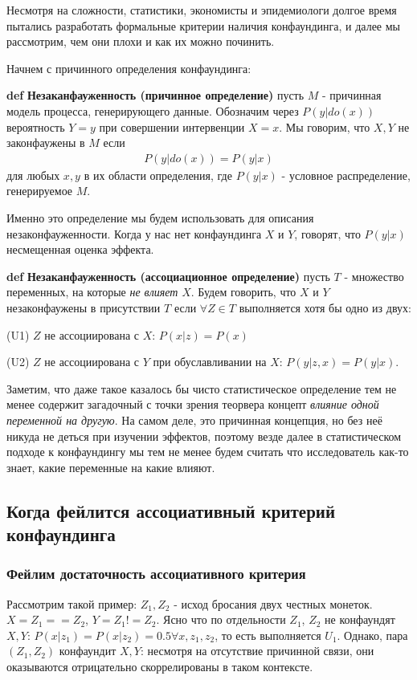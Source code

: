 \documentclass[fleqn]{article}
\def\define#1{\textbf{def} \textbf{#1}}
\numberwithin{equation}{section}
\numberwithin{theorem}{section}
\numberwithin{figure}{section}
\numberwithin{lemma}{section}
\numberwithin{corollary}{section}
\begin{document}
Несмотря на сложности, статистики, экономисты и эпидемиологи долгое время пытались разработать формальные критерии наличия конфаундинга, и далее мы рассмотрим, чем они плохи и как их можно починить.

Начнем с причинного определения конфаундинга:

\define{Незаканфауженность (причинное определение)} пусть $M$ - причинная модель процесса, генерирующего данные. Обозначим через $P(y|do(x))$ вероятность $Y = y$ при совершении интервенции $X=x$. Мы говорим, что $X, Y$  не законфаужены в $M$ если 
\begin{align}
	P(y|do(x)) = P(y|x)
\end{align}
для любых $x,y$ в их области определения, где $P(y|x)$ - условное распределение, генерируемое $M$.

Именно это определение мы будем использовать для описания незаконфауженности. Когда у нас нет конфаундинга $X$ и $Y$, говорят, что $P(y|x)$ несмещенная оценка эффекта.

\define{Незаканфауженность (ассоциационное определение)} пусть $T$ - множество переменных, на которые \textit{не влияет} $X$. Будем говорить, что $X$ и $Y$ незаконфаужены в присутствии $T$ если $\forall Z \in T$ выполняется хотя бы одно из двух:

(U1) $Z$ не ассоциирована с $X$: $P(x|z) = P(x)$

(U2) $Z$ не ассоциирована с $Y$ при обуславливании на $X$: $P(y|z,x) = P(y|x)$.


Заметим, что даже такое казалось бы чисто статистическое определение тем не менее содержит загадочный с точки зрения теорвера концепт \textit{влияние одной переменной на другую}. На самом деле, это причинная концепция, но без неё никуда не деться при изучении эффектов, поэтому везде далее в статистическом подходе к конфаундингу мы тем не менее будем считать что исследователь как-то знает, какие переменные на какие влияют. 

\subsection*{Когда фейлится ассоциативный критерий конфаундинга}

\subsubsection*{Фейлим  достаточность ассоциативного критерия}

Рассмотрим такой пример: $Z_1, Z_2$ - исход бросания двух честных монеток. $X = Z_1 == Z_2$, $Y = Z_1 != Z_2$. Ясно что по отдельности $Z_1$, $Z_2$ не конфаундят $X,Y$: $P(x|z_1) = P(x|z_2) = 0.5 \forall x, z_1, z_2$, то есть выполняется $U_1$. Однако, пара $(Z_1,Z_2)$ конфаундит $X,Y$: несмотря на отсутствие причинной связи, они оказываются отрицательно скоррелированы в таком контексте. 
\end{document}
